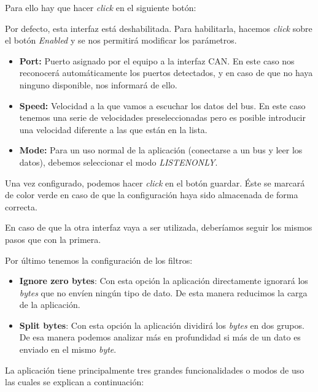 Para ello hay que hacer \emph{click} en el siguiente botón:


Por defecto, esta interfaz está deshabilitada. Para habilitarla, hacemos \emph{click} sobre el botón \emph{Enabled} y se nos permitirá modificar los parámetros.


\begin{itemize}
\item
\textbf{Port:} Puerto asignado por el equipo a la interfaz CAN. En este caso nos reconocerá automáticamente los puertos detectados, y en caso de que no haya ninguno disponible, nos informará de ello.
\item
\textbf{Speed:} Velocidad a la que vamos a escuchar los datos del bus. En este caso tenemos una serie de velocidades preseleccionadas pero es posible introducir una velocidad diferente a las que están en la lista.
\item
\textbf{Mode:} Para un uso normal de la aplicación (conectarse a un bus y leer los datos), debemos seleccionar el modo \emph{LISTENONLY}.
\end{itemize}

Una vez configurado, podemos hacer \emph{click} en el botón guardar. Éste se marcará de color verde en caso de que la configuración haya sido almacenada de forma correcta.

En caso de que la otra interfaz vaya a ser utilizada, deberíamos seguir los mismos pasos que con la primera.

Por último tenemos la configuración de los filtros:


\begin{itemize}
\item
\textbf{Ignore zero bytes}: Con esta opción la aplicación directamente ignorará los \emph{bytes} que no envíen ningún tipo de dato. De esta manera reducimos la carga de la aplicación.
\item
\textbf{Split bytes}: Con esta opción la aplicación dividirá los \emph{bytes} en dos grupos. De esa manera podemos analizar más en profundidad si más de un dato es enviado en el mismo \emph{byte}.

\end{itemize}

La aplicación tiene principalmente tres grandes funcionalidades o modos de uso las cuales se explican a continuación:

